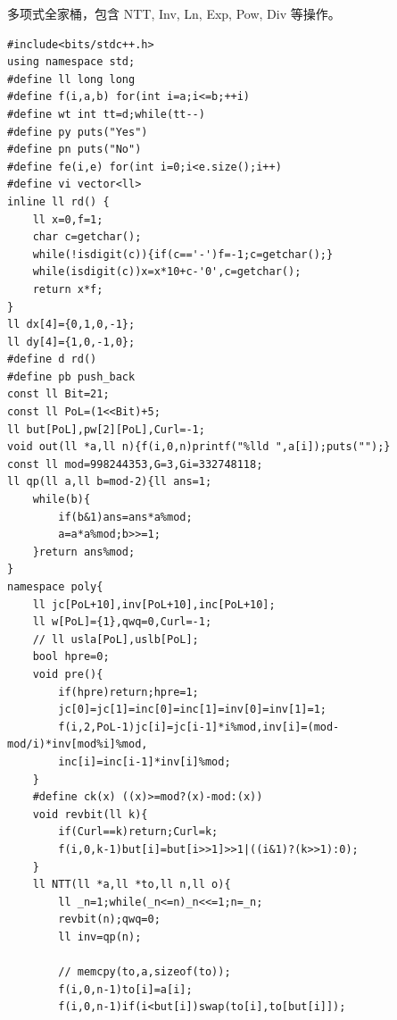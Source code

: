 多项式全家桶，包含 NTT, Inv, Ln, Exp, Pow, Div 等操作。
\begin{lstlisting}
#include<bits/stdc++.h>
using namespace std;
#define ll long long
#define f(i,a,b) for(int i=a;i<=b;++i)
#define wt int tt=d;while(tt--)
#define py puts("Yes")
#define pn puts("No")
#define fe(i,e) for(int i=0;i<e.size();i++)
#define vi vector<ll>
inline ll rd() {
	ll x=0,f=1;
	char c=getchar();
	while(!isdigit(c)){if(c=='-')f=-1;c=getchar();}
	while(isdigit(c))x=x*10+c-'0',c=getchar();
	return x*f;
}
ll dx[4]={0,1,0,-1};
ll dy[4]={1,0,-1,0};
#define d rd()
#define pb push_back
const ll Bit=21;
const ll PoL=(1<<Bit)+5;
ll but[PoL],pw[2][PoL],Curl=-1;
void out(ll *a,ll n){f(i,0,n)printf("%lld ",a[i]);puts("");}
const ll mod=998244353,G=3,Gi=332748118;
ll qp(ll a,ll b=mod-2){ll ans=1;
	while(b){
		if(b&1)ans=ans*a%mod;
		a=a*a%mod;b>>=1;
	}return ans%mod;
}
namespace poly{
	ll jc[PoL+10],inv[PoL+10],inc[PoL+10];
	ll w[PoL]={1},qwq=0,Curl=-1;
	// ll usla[PoL],uslb[PoL];
	bool hpre=0;
	void pre(){
		if(hpre)return;hpre=1;
		jc[0]=jc[1]=inc[0]=inc[1]=inv[0]=inv[1]=1;
		f(i,2,PoL-1)jc[i]=jc[i-1]*i%mod,inv[i]=(mod-mod/i)*inv[mod%i]%mod,
		inc[i]=inc[i-1]*inv[i]%mod;
	}
	#define ck(x) ((x)>=mod?(x)-mod:(x))
	void revbit(ll k){
		if(Curl==k)return;Curl=k;
		f(i,0,k-1)but[i]=but[i>>1]>>1|((i&1)?(k>>1):0);
	}
	ll NTT(ll *a,ll *to,ll n,ll o){
		ll _n=1;while(_n<=n)_n<<=1;n=_n;
		revbit(n);qwq=0;
		ll inv=qp(n);

		// memcpy(to,a,sizeof(to));
		f(i,0,n-1)to[i]=a[i];
		f(i,0,n-1)if(i<but[i])swap(to[i],to[but[i]]);


\end{lstlisting}
